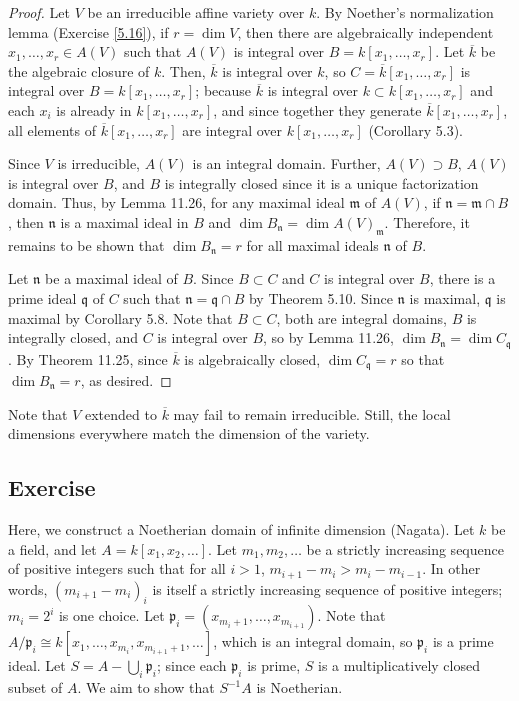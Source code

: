 \begin{proof}
Let $V$ be an irreducible affine variety over $k$. By Noether's normalization lemma (Exercise \ref{5.16}), if $r = \dim V$, then there
are algebraically independent $x_1,\ldots,x_r \in A(V)$ such that $A(V)$ is integral over $B = k[x_1,\ldots,x_r]$. Let $\overline{k}$ be the 
algebraic closure of $k$. Then, $\overline{k}$ is integral over $k$, so 
$C = \overline{k}[x_1,\ldots,x_r]$ is integral over $B = k[x_1,\ldots,x_r]$; because $\overline{k}$ is integral over $k \subset k[x_1,\ldots,x_r]$ 
and each $x_i$ is already in $k[x_1,\ldots,x_r]$, and since together they generate $\overline{k}[x_1,\ldots,x_r]$, all elements of 
$\overline{k}[x_1,\ldots,x_r]$ are integral over $k[x_1,\ldots,x_r]$ (Corollary 5.3).

Since $V$ is irreducible, $A(V)$ is an integral domain. Further, $A(V) \supset B$, $A(V)$ is integral over $B$, and $B$ is integrally closed since
it is a unique factorization domain. Thus,
by Lemma 11.26, for any maximal ideal $\mathfrak{m}$ of $A(V)$, if $\mathfrak{n} = \mathfrak{m} \cap B$, then $\mathfrak{n}$ is a maximal ideal
in $B$ and $\dim B_{\mathfrak{n}} = \dim A(V)_{\mathfrak{m}}$. Therefore, it remains to be shown that $\dim B_{\mathfrak{n}} = r$ for all maximal 
ideals $\mathfrak{n}$ of $B$.

Let $\mathfrak{n}$ be a maximal ideal of $B$. Since $B \subset C$ and $C$ is integral over $B$, there is a prime ideal $\mathfrak{q}$ of $C$ such that
$\mathfrak{n} = \mathfrak{q} \cap B$ by Theorem 5.10. Since $\mathfrak{n}$ is maximal, $\mathfrak{q}$ is maximal by Corollary 5.8. Note that $B \subset C$,
both are integral domains, $B$ is integrally closed, and $C$ is integral over $B$, so by Lemma 11.26, $\dim B_{\mathfrak{n}} = \dim C_{\mathfrak{q}}$. By
Theorem 11.25, since $\overline{k}$ is algebraically closed, $\dim C_{\mathfrak{q}} = r$ so that $\dim B_{\mathfrak{n}} = r$, as desired.
\end{proof}

\begin{remark}
Note that $V$ extended to $\overline{k}$ may fail to remain irreducible. Still, the local dimensions everywhere match the dimension of the variety.
\end{remark}

\subsection{Exercise}\label{11.4}

Here, we construct a Noetherian domain of infinite dimension (Nagata). Let $k$ be a field, and let $A = k[x_1,x_2,\ldots]$. Let
$m_1,m_2,\ldots$ be a strictly increasing sequence of positive integers such that for all $i > 1$, $m_{i+1} - m_i > m_i - m_{i-1}$. 
In other words, $(m_{i+1} - m_i)_i$ is itself a strictly increasing sequence of positive integers; $m_i = 2^i$ is one choice.
Let $\mathfrak{p}_i = (x_{m_i + 1},\ldots,x_{m_{i+1}})$. Note that $A/\mathfrak{p}_i \cong k[x_1,\ldots,x_{m_i},x_{m_{i+1}+1},\ldots]$,
which is an integral domain, so $\mathfrak{p}_i$ is a prime ideal. Let $S = A - \bigcup_i \mathfrak{p}_i$; since each $\mathfrak{p}_i$
is prime, $S$ is a multiplicatively closed subset of $A$. We aim to show that $S^{-1}A$ is Noetherian.

